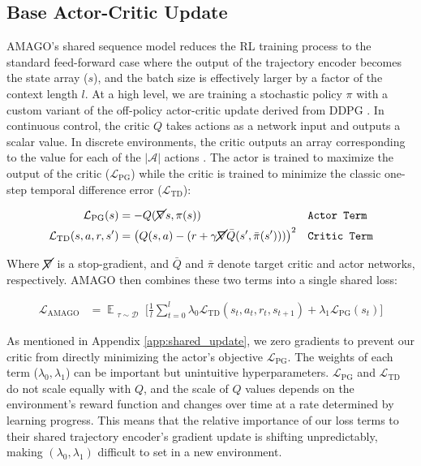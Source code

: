 \subsection{Base Actor-Critic Update}

\label{app:actor-critic}
AMAGO's shared sequence model reduces the RL training process to the standard feed-forward case where the output of the trajectory encoder becomes the state array ($s$), and the batch size is effectively larger by a factor of the context length $l$. At a high level, we are training a stochastic policy $\pi$ with a custom variant of the off-policy actor-critic update derived from DDPG \cite{lillicrap2015continuous}. In continuous control, the critic $Q$ takes actions as a network input and outputs a scalar value. In discrete environments, the critic outputs an array corresponding to the value for each of the $\mathcal{|A|}$ actions \cite{christodoulou2019soft}. The actor is trained to maximize the output of the critic ($\mathcal{L}_{\text{PG}}$) while the critic is trained to minimize the classic one-step temporal difference error ($\mathcal{L}_{\text{TD}}$):

\begin{align}
\label{eq:actor_loss}
    \mathcal{L}_{\text{PG}}(s) &= -Q(\cancel{\nabla} s, \pi(s)) && \text{\texttt{Actor Term}}\\
    \mathcal{L}_{\text{TD}}(s, a, r, s') &= \big(Q(s, a) - (r + \gamma \cancel{\nabla}\bar{Q}(s', \bar{\pi}(s')))\big)^2 && \text{\texttt{Critic Term}}
\end{align}

Where $\cancel{\nabla}$ is a stop-gradient, and $\bar{Q}$ and $\bar{\pi}$ denote target critic and actor networks, respectively. AMAGO then combines these two terms into a single shared loss:

\begin{align}
\displaystyle \mathcal{L}_{\text{AMAGO}}&= \mathop{\mathbb{E}}_{\substack{\tau \sim \mathcal{D}}}\bigg[\frac{1}{l} \sum_{t=0}^{l} \lambda_0 \mathcal{L}_{\text{TD}}(s_t, a_t, r_t, s_{t+1}) + \lambda_1 \mathcal{L}_{\text{PG}}(s_t)\bigg]
\label{eq:loss}
\end{align}

As mentioned in Appendix \ref{app:shared_update}, we zero gradients to prevent our critic from directly minimizing the actor's objective $\mathcal{L}_{\text{PG}}$. The weights of each term ($\lambda_0, \lambda_1$) can be important but unintuitive hyperparameters. $\mathcal{L}_{\text{PG}}$ and $\mathcal{L}_{\text{TD}}$ do not scale equally with $Q$, and the scale of $Q$ values depends on the environment's reward function and changes over time at a rate determined by learning progress. This means that the relative importance of our loss terms to their shared trajectory encoder's gradient update is shifting unpredictably, making $(\lambda_0, \lambda_1)$ difficult to set in a new environment. 

